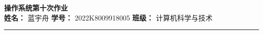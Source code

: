 \newcommand{\Homework}{操作系统第十次作业}
\newcommand{\Name}{蓝宇舟}
\newcommand{\StudentNumber}{2022K8009918005}
\newcommand{\Class}{计算机科学与技术}

\begingroup
    \centering
    \LARGE {\bf \Homework} \\[0.5em]
    \large \textbf{姓名：} \Name \hspace{2em}
           \textbf{学号：} \StudentNumber \hspace{2em}
           \textbf{班级：} \Class \par
\endgroup
\rule{\textwidth}{0.4pt}
\printanswers
